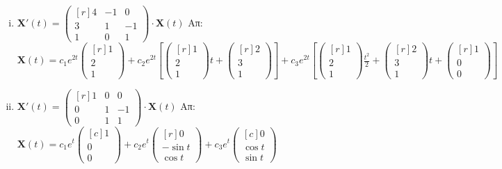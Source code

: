 \begin{enumerate}
\begin{enumerate}[i)]
      \item $ \mathbf{X}'(t) = 
        \begin{pmatrix*}[r]
          4 & -1 & 0 \\
          3 & 1 & -1 \\
          1 & 0 & 1
        \end{pmatrix*} \cdot 
        \mathbf{X}(t)$
        \hfill Απ: {\scriptsize $ \mathbf{X}(t)= c_{1} e^{2t}
          \begin{pmatrix*}[r] 1 \\ 2 \\ 1 \end{pmatrix*} + c_{2}e^{2t} \left[ 
            \begin{pmatrix*}[r] 1 \\ 2 \\ 1 \end{pmatrix*}t + 
            \begin{pmatrix*}[r] 2 \\ 3 \\ 1 \end{pmatrix*} \right] + c_{3}e^{2t} \left[
            \begin{pmatrix*}[r] 1 \\ 2 \\ 1 \end{pmatrix*} \frac{t^{2}}{2} +  
            \begin{pmatrix*}[r] 2 \\ 3 \\ 1 \end{pmatrix*} t + 
        \begin{pmatrix*}[r] 1 \\ 0 \\ 0 \end{pmatrix*}\right]  $} 

      \item $ \mathbf{X}'(t) = 
        \begin{pmatrix*}[r]
          1 & 0 & 0 \\
          0 & 1 & -1 \\
          0 & 1 & 1
        \end{pmatrix*} \cdot 
        \mathbf{X}(t) $
        \hfill Απ: {\scriptsize $ \mathbf{X}(t) = c_{1}e^{t} 
          \begin{pmatrix*}[c] 1 \\ 0 \\ 0 \end{pmatrix*} + c_{2}e^{t} 
          \begin{pmatrix*}[r] 0 \\ - \sin{t} \\ \cos{t}  \end{pmatrix*} + c_{3}e^{t} 
        \begin{pmatrix*}[c] 0 \\ \cos{t} \\ \sin{t}   \end{pmatrix*}$} 
    \end{enumerate}


\end{enumerate}
